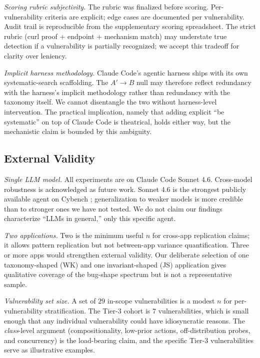 \documentclass[conference]{IEEEtran}
\begin{document}
\textit{Scoring rubric subjectivity.} The rubric was finalized before scoring. Per-vulnerability criteria are explicit; edge cases are documented per vulnerability. Audit trail is reproducible from the supplementary scoring spreadsheet. The strict rubric (curl proof + endpoint + mechanism match) may understate true detection if a vulnerability is partially recognized; we accept this tradeoff for clarity over leniency.

\textit{Implicit harness methodology.} Claude Code's agentic harness ships with its own systematic-search scaffolding. The $A' \to B$ null may therefore reflect redundancy with the harness's implicit methodology rather than redundancy with the taxonomy itself. We cannot disentangle the two without harness-level intervention. The practical implication, namely that adding explicit ``be systematic'' on top of Claude Code is theatrical, holds either way, but the mechanistic claim is bounded by this ambiguity.

\subsection{External Validity}

\textit{Single LLM model.} All experiments are on Claude Code Sonnet 4.6. Cross-model robustness is acknowledged as future work. Sonnet 4.6 is the strongest publicly available agent on Cybench \cite{zhang2024cybench}; generalization to weaker models is more credible than to stronger ones we have not tested. We do not claim our findings characterize ``LLMs in general,'' only this specific agent.

\textit{Two applications.} Two is the minimum useful $n$ for cross-app replication claims; it allows pattern replication but not between-app variance quantification. Three or more apps would strengthen external validity. Our deliberate selection of one taxonomy-shaped (WK) and one invariant-shaped (JS) application gives qualitative coverage of the bug-shape spectrum but is not a representative sample.

\textit{Vulnerability set size.} A set of $29$ in-scope vulnerabilities is a modest $n$ for per-vulnerability stratification. The Tier-3 cohort is $7$ vulnerabilities, which is small enough that any individual vulnerability could have idiosyncratic reasons. The \emph{class}-level argument (compositionality, low-prior actions, off-distribution probes, and concurrency) is the load-bearing claim, and the specific Tier-3 vulnerabilities serve as illustrative examples.
\end{document}
